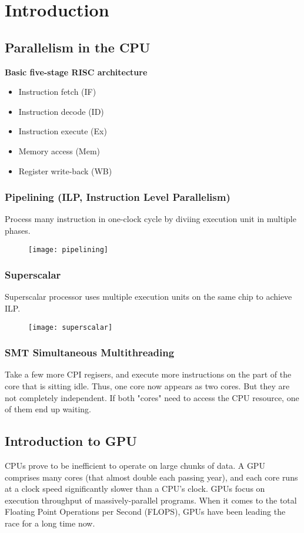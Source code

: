 \documentclass[../notes.tex]{subfiles}
\begin{document}
\section{Introduction}

\subsection{Parallelism in the CPU}
\textbf{Basic five-stage RISC architecture}
\begin{itemize}
\item Instruction fetch (IF)
\item Instruction decode (ID)
\item Instruction execute (Ex)
\item Memory access (Mem)
\item Register write-back (WB)
\end{itemize}

\subsubsection{Pipelining (ILP, Instruction Level Parallelism)}
Process many instruction in one-clock cycle by diviing execution unit in multiple phases.
\begin{figure}[h]
  \texttt{[image: pipelining]}
\end{figure}

\subsubsection{Superscalar}
Superscalar processor uses multiple execution units on the same chip to achieve ILP.
\begin{figure}[h]
  \texttt{[image: superscalar]}
\end{figure}

\subsubsection{SMT Simultaneous Multithreading}
Take a few more CPI regisers, and execute more instructions on the part of the core that is sitting idle. Thus, one core now appears as two cores. But they are not completely independent. If both "cores" need to access the CPU resource, one of them end up waiting.

\subsection{Introduction to GPU}
CPUs prove to be inefficient to operate on large chunks of data. A GPU comprises many cores (that almost double each passing year), and each core runs at a clock speed significantly slower than a CPU's clock. GPUs focus on execution throughput of massively-parallel programs. When it comes to the total Floating Point Operations per Second (FLOPS), GPUs have been leading the race for a long time now.
\end{document}
